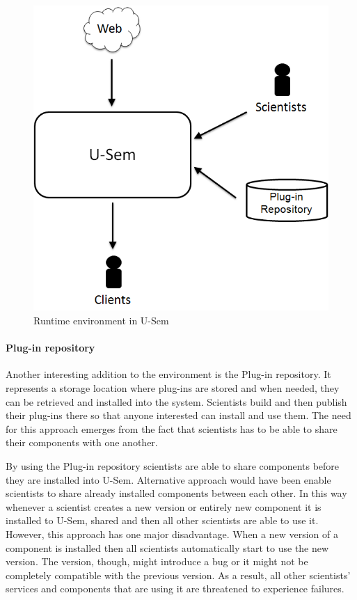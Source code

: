 \begin{figure}[h!]
  \centering
  	\includegraphics[scale=0.5]{plug-in/environment/runtime_env.png}
  \caption{Runtime environment in U-Sem }
\end{figure}

\paragraph{Plug-in repository}
Another interesting addition to the environment is the Plug-in repository. It represents a storage location where plug-ins are stored and when needed, they can be retrieved and installed into the system. Scientists build and then publish their plug-ins there so that anyone interested can install and use them. The need for this approach emerges from the fact that scientists has to be able to share their components with one another.

By using the Plug-in repository scientists are able to share components before they are installed into U-Sem. Alternative approach would have been enable scientists to share already installed components between each other. In this way whenever a scientist creates a new version or entirely new component it is installed to U-Sem, shared and then all other scientists are able to use it. However, this approach has one major disadvantage. When a new version of a component is installed then all scientists automatically start to use the new version. The version, though, might introduce a bug or it might not be completely compatible with the previous version. As a result, all other scientists' services and components that are using it are threatened to experience failures. 

